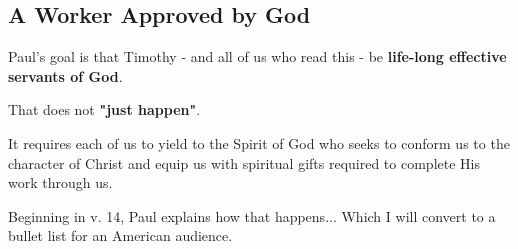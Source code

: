 \documentclass[12pt]{article} %
\begin{document}
\subsection{A Worker Approved by God}

Paul's goal is that Timothy - and all of us who read this - 
be \textbf{life-long effective servants of God}.

That does not \textbf{"just happen"}.

It requires each of us to yield to the Spirit of God who seeks
to conform us to the character of Christ and equip us with
spiritual gifts required to complete His work through us.

Beginning in v. 14, Paul explains how that happens... Which I will
convert to a bullet list for an American audience.
\end{document}
